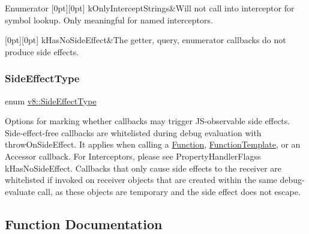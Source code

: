 \begin{DoxyEnumFields}{Enumerator}
[0pt][0pt]{}\mbox{\label{namespacev8_af4789f0aeb8680e353901a35810cac1aa5258a8ba1695c486fea7d5b126c95509}} 
k\+Only\+Intercept\+Strings&Will not call into interceptor for symbol lookup. Only meaningful for named interceptors. \\
\hline

[0pt][0pt]{}\mbox{\label{namespacev8_af4789f0aeb8680e353901a35810cac1aa5168ab38be99edd5ce1e4cb991b21f51}} 
k\+Has\+No\+Side\+Effect&The getter, query, enumerator callbacks do not produce side effects. \\
\hline

\end{DoxyEnumFields}
\mbox{\label{namespacev8_a29711319c2b9fc7716d65faee2f7b9cb}} 
\subsubsection{\texorpdfstring{Side\+Effect\+Type}{SideEffectType}}
{\footnotesize\ttfamily enum \mbox{\hyperlink{namespacev8_a29711319c2b9fc7716d65faee2f7b9cb}{v8\+::\+Side\+Effect\+Type}}\hspace{0.3cm}{\ttfamily [strong]}}

Options for marking whether callbacks may trigger J\+S-\/observable side effects. Side-\/effect-\/free callbacks are whitelisted during debug evaluation with throw\+On\+Side\+Effect. It applies when calling a \mbox{\hyperlink{classv8_1_1Function}{Function}}, \mbox{\hyperlink{classv8_1_1FunctionTemplate}{Function\+Template}}, or an Accessor callback. For Interceptors, please see Property\+Handler\+Flags\textquotesingle{}s k\+Has\+No\+Side\+Effect. Callbacks that only cause side effects to the receiver are whitelisted if invoked on receiver objects that are created within the same debug-\/evaluate call, as these objects are temporary and the side effect does not escape. 

\subsection{Function Documentation}
\mbox{\label{namespacev8_a801e3a2af23e3fdef8b4a728bccbcccf}} 

